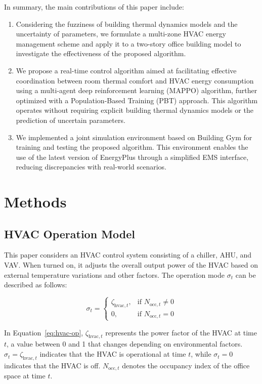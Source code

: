\documentclass[preprint,12pt]{elsarticle}
\begin{document}
In summary, the main contributions of this paper include:
\begin{enumerate}[label=\arabic*)]
    \item Considering the fuzziness of building thermal dynamics models and the uncertainty of parameters, we formulate a multi-zone HVAC energy management scheme and apply it to a two-story office building model to investigate the effectiveness of the proposed algorithm.
    \item We propose a real-time control algorithm aimed at facilitating effective coordination between room thermal comfort and HVAC energy consumption using a multi-agent deep reinforcement learning (MAPPO) algorithm, further optimized with a Population-Based Training (PBT) approach. This algorithm operates without requiring explicit building thermal dynamics models or the prediction of uncertain parameters.
    \item We implemented a joint simulation environment based on Building Gym for training and testing the proposed algorithm. This environment enables the use of the latest version of EnergyPlus through a simplified EMS interface, reducing discrepancies with real-world scenarios.
\end{enumerate}
\section{Methods}

\subsection{HVAC Operation Model}

This paper considers an HVAC control system consisting of a chiller, AHU, and VAV. When turned on, it adjusts the overall output power of the HVAC based on external temperature variations and other factors. The operation mode $\sigma_t$ can be described as follows:

\begin{equation} \label{eq:hvac-op}
    \sigma_t = 
    \begin{cases} 
        \zeta_{\text{hvac},t}, & \text{if } N_{\text{occ},t} \neq 0 \\
        0, & \text{if } N_{\text{occ},t} = 0 
    \end{cases}
\end{equation}

In Equation~\ref{eq:hvac-op}, $\zeta_{\text{hvac},t}$ represents the power factor of the HVAC at time $t$, 
a value between 0 and 1 that changes depending on environmental factors. $\sigma_t = \zeta_{\text{hvac},t}$ 
indicates that the HVAC is operational at time $t$, while $\sigma_t = 0$ indicates that the HVAC is off.
 $N_{\text{occ},t}$ denotes the occupancy index of the office space at time $t$.
\end{document}
